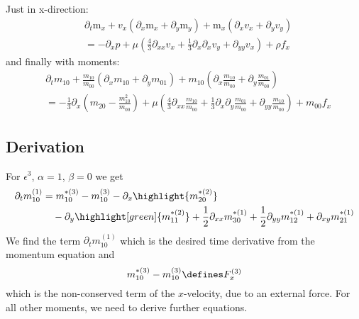 Just in x-direction:
\begin{equation}
  \begin{aligned}
    & \partial_t \text{m}_x
    + v_x (\partial_x \text{m}_x + \partial_y \text{m}_y)
    + \text{m}_x (\partial_x v_x + \partial_y v_y)  \\
    & =
     - \partial_x p
     + \mu \left(\frac{4}{3}\partial_{xx}v_x
            + \frac{1}{3}\partial_x\partial_x v_y
            + \partial_{yy} v_x \right)  + \rho f_x
  \end{aligned}
\end{equation}
and finally with moments:
\begin{equation}
  \begin{aligned}
    & \partial_t m_{10}
    + \frac{m_{10}}{m_{00}} (\partial_x m_{10} + \partial_y m_{01})
    + m_{10} (\partial_x \frac{m_{10}}{m_{00}} + \partial_y \frac{m_{01}}{m_{00}})  \\
    & =
    - \frac{1}{3} \partial_x \left(m_{20} - \frac{ m_{10}^2 }{ m_{00} } \right)
     + \mu \left(\frac{4}{3}\partial_{xx}\frac{m_{10}}{m_{00}}
            + \frac{1}{3}\partial_x\partial_y \frac{m_{01}}{m_{00}}
            + \partial_{yy} \frac{m_{10}}{m_{00}} \right) + m_{00}f_x
  \end{aligned}
\end{equation}

\subsection{Derivation}
\label{sub:Derivation of momentum equation}

For $\epsilon^3$, $\alpha=1$, $\beta=0$ we get
\begin{equation}
  \label{eq: start of momentum equation derivation}
  \begin{aligned}
     \partial_t m_{10}^{(1)} & =
    m_{10}^{*(3)} - m_{10}^{(3)} - \partial_x \highlight{m_{20}^{*(2)}} \\
    &\quad - \partial_y \highlight[green]{m_{11}^{*(2)}} + \frac{1}{2}\partial_{xx} m_{30}^{*(1)} + \frac{1}{2} \partial_{yy} m_{12}^{*(1)} + \partial_{xy} m_{21}^{*(1)}
  \end{aligned}
\end{equation}
We find the term $\partial_t m_{10}^{(1)} $ which is the desired time derivative from the momentum equation and
\begin{equation}
  m_{10}^{*(3)} - m_{10}^{(3)}\defines F_x^{(3)}
\end{equation}
 which is the non-conserved term of the $x$-velocity, due to an external force. For all other moments, we need to derive further equations.


